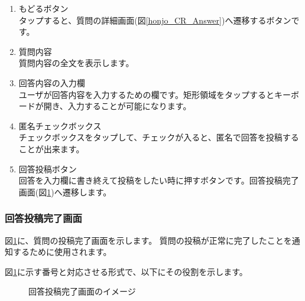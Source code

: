 \documentclass[a4j]{jarticle}
\begin{document}
\begin{enumerate}
  \renewcommand{\labelenumi}{\textcircled{\scriptsize \theenumi}}
  \item もどるボタン\\
        タップすると、質問の詳細画面(図\ref{honjo_CR_Answer})へ遷移するボタンです。
  \item 質問内容\\
        質問内容の全文を表示します。
  \item 回答内容の入力欄\\
        ユーザが回答内容を入力するための欄です。矩形領域をタップするとキーボードが開き、入力することが可能になります。
  \item 匿名チェックボックス\\
        チェックボックスをタップして、チェックが入ると、匿名で回答を投稿することが出来ます。
  \item 回答投稿ボタン\\
        回答を入力欄に書き終えて投稿をしたい時に押すボタンです。回答投稿完了画面(図\ref{honjo_CR_CompleteAnswer})へ遷移します。
\end{enumerate}

\newpage
\subsubsection{回答投稿完了画面}
図\ref{honjo_CR_CompleteAnswer}に、質問の投稿完了画面を示します。
質問の投稿が正常に完了したことを通知するために使用されます。

図\ref{honjo_CR_CompleteAnswer}に示す番号と対応させる形式で、以下にその役割を示します。

\begin{figure}[H]
    \begin{center}
    \caption {回答投稿完了画面のイメージ}
    \label{honjo_CR_CompleteAnswer}
    \end{center}
\end{figure}
\end{document}
